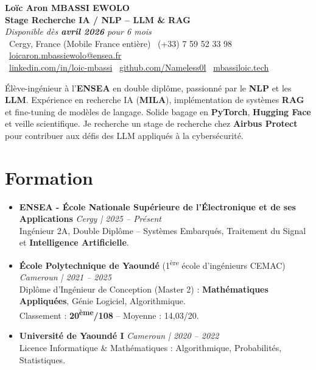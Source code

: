 \documentclass[a4paper,11pt]{article}
\begin{document}
\begin{center}
    {\Large \textbf{Loïc Aron MBASSI EWOLO}} \\ \vspace{4pt}
    \textbf{\large Stage Recherche IA / NLP -- LLM \& RAG} \\
    \textit{\small Disponible dès \textbf{avril 2026} pour 6 mois} \\ \vspace{4pt}
    \small
    \faMapMarker\ Cergy, France (Mobile France entière) \quad
    \faPhone\ (+33) 7 59 52 33 98 \quad
    \faEnvelope\ \href{mailto:loicaron.mbassiewolo@ensea.fr}{loicaron.mbassiewolo@ensea.fr} \\ \vspace{2pt}
    \faLinkedin\ \href{https://www.linkedin.com/in/loic-aron-mbassi-ewolo-3942a9246/}{linkedin.com/in/loic-mbassi} \quad
    \faGithub\ \href{https://github.com/Nameless0l}{github.com/Nameless0l} \quad
    \faGlobe\ \href{https://mbassiloic.tech}{mbassiloic.tech}
\end{center}

\vspace{-6pt}

\noindent\small{Élève-ingénieur à l'\textbf{ENSEA} en double diplôme, passionné par le \textbf{NLP} et les \textbf{LLM}. Expérience en recherche IA (\textbf{MILA}), implémentation de systèmes \textbf{RAG} et fine-tuning de modèles de langage. Solide bagage en \textbf{PyTorch}, \textbf{Hugging Face} et veille scientifique. Je recherche un stage de recherche chez \textbf{Airbus Protect} pour contribuer aux défis des LLM appliqués à la cybersécurité.}

\section{Formation}
\begin{itemize}[leftmargin=*, label=\tiny$\bullet$, nosep]
    \item \textbf{ENSEA - École Nationale Supérieure de l'Électronique et de ses Applications} \hfill \textit{Cergy | 2025 -- Présent} \\
    \small{Ingénieur 2A, Double Diplôme -- Systèmes Embarqués, Traitement du Signal et \textbf{Intelligence Artificielle}.}
    \vspace{2pt}
    \item \textbf{École Polytechnique de Yaoundé} (1\textsuperscript{ère} école d'ingénieurs CEMAC) \hfill \textit{Cameroun | 2021 -- 2025} \\
    \small{Diplôme d'Ingénieur de Conception (Master 2) : \textbf{Mathématiques Appliquées}, Génie Logiciel, Algorithmique.} \\
    \small{Classement : \textbf{20\textsuperscript{ème}/108} -- Moyenne : 14,03/20.}
    \vspace{2pt}
    \item \textbf{Université de Yaoundé I} \hfill \textit{Cameroun | 2020 -- 2022} \\
    \small{Licence Informatique \& Mathématiques : Algorithmique, Probabilités, Statistiques.}
\end{itemize}
\end{document}
